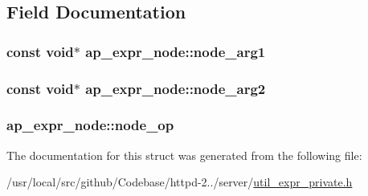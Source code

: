\subsection{Field Documentation}
\subsubsection[{\texorpdfstring{node\+\_\+arg1}{node_arg1}}]{\setlength{\rightskip}{0pt plus 5cm}const {\bf void}$\ast$ ap\+\_\+expr\+\_\+node\+::node\+\_\+arg1}\hypertarget{structap__expr__node_a7a92cd94ac023bfb5323bf67f479872d}{}\label{structap__expr__node_a7a92cd94ac023bfb5323bf67f479872d}
\subsubsection[{\texorpdfstring{node\+\_\+arg2}{node_arg2}}]{\setlength{\rightskip}{0pt plus 5cm}const {\bf void}$\ast$ ap\+\_\+expr\+\_\+node\+::node\+\_\+arg2}\hypertarget{structap__expr__node_a6628e97b8f9d33e1d9a1c7d6c745bf01}{}\label{structap__expr__node_a6628e97b8f9d33e1d9a1c7d6c745bf01}
\subsubsection[{\texorpdfstring{node\+\_\+op}{node_op}}]{ ap\+\_\+expr\+\_\+node\+::node\+\_\+op}\hypertarget{structap__expr__node_a5a3b5aa29dda5016e9b4395f8d13bb68}{}\label{structap__expr__node_a5a3b5aa29dda5016e9b4395f8d13bb68}


The documentation for this struct was generated from the following file\+:\begin{DoxyCompactItemize}
\item 
/usr/local/src/github/\+Codebase/httpd-\/2../server/\hyperlink{util__expr__private_8h}{util\+\_\+expr\+\_\+private.\+h}\end{DoxyCompactItemize}
